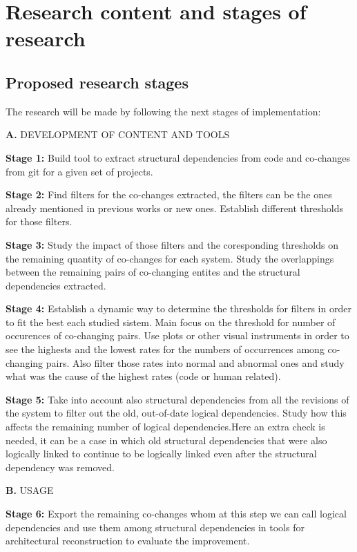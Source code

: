 \documentclass[12pt]{mitthesis}
\begin{document}

\chapter{Research content and stages of research}

\section{Proposed research stages}
The research will be made by following the next stages of implementation:


\textbf{A.} DEVELOPMENT OF CONTENT AND TOOLS

\textbf{Stage 1:} Build tool to extract structural dependencies from code and co-changes from git for a given set of projects.

\textbf{Stage 2:} Find filters for the co-changes extracted, the filters can be the ones already mentioned in previous works or new ones. Establish different thresholds for those filters.

\textbf{Stage 3:} Study the impact of those filters and the coresponding thresholds on the remaining quantity of co-changes for each system.
Study the overlappings between the remaining pairs of co-changing entites and the structural dependencies extracted. \cite{enase19}

\textbf{Stage 4:} Establish a dynamic way to determine the thresholds for filters in order to fit the best each studied sistem. Main focus on the threshold for number of occurences of co-changing pairs.
Use plots or other visual instruments in order to see the highests and the lowest rates for the numbers of occurrences among co-changing pairs.
Also filter those rates into normal and abnormal ones and study what was the cause of the highest rates (code or human related).

\textbf{Stage 5:} Take into account also structural dependencies from all the revisions of the system to filter out the old, out-of-date logical dependencies. 
Study how this affects the remaining number of logical dependencies.Here an extra check is needed, it can be a case in which old structural dependencies that were also logically linked to continue to be logically linked
even after the structural dependency was removed.

\textbf{B.} USAGE

\textbf{Stage 6:} Export the remaining co-changes whom at this step we can call logical dependencies and use them among structural dependencies in tools for architectural reconstruction to evaluate the improvement.
\end{document}
